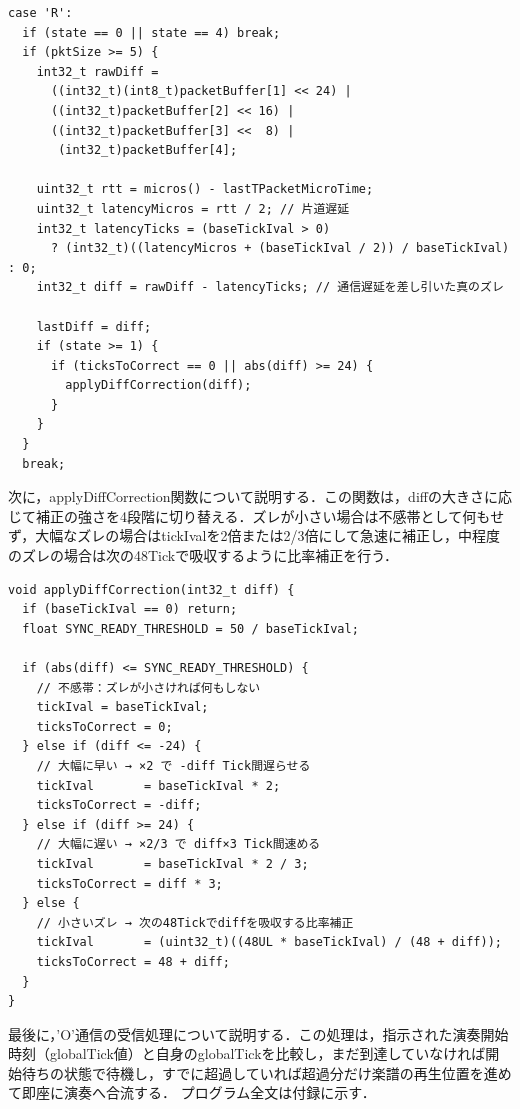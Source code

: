 \begin{lstlisting}[caption={flute\_0706.inoのloop関数（'R'通信受信部分・要部）}, label={lst:douki_slave_r}]
case 'R':
  if (state == 0 || state == 4) break;
  if (pktSize >= 5) {
    int32_t rawDiff =
      ((int32_t)(int8_t)packetBuffer[1] << 24) |
      ((int32_t)packetBuffer[2] << 16) |
      ((int32_t)packetBuffer[3] <<  8) |
       (int32_t)packetBuffer[4];

    uint32_t rtt = micros() - lastTPacketMicroTime;
    uint32_t latencyMicros = rtt / 2; // 片道遅延
    int32_t latencyTicks = (baseTickIval > 0)
      ? (int32_t)((latencyMicros + (baseTickIval / 2)) / baseTickIval) : 0;
    int32_t diff = rawDiff - latencyTicks; // 通信遅延を差し引いた真のズレ

    lastDiff = diff;
    if (state >= 1) {
      if (ticksToCorrect == 0 || abs(diff) >= 24) {
        applyDiffCorrection(diff);
      }
    }
  }
  break;
\end{lstlisting}

次に，applyDiffCorrection関数について説明する．この関数は，diffの大きさに応じて補正の強さを4段階に切り替える．ズレが小さい場合は不感帯として何もせず，大幅なズレの場合はtickIvalを2倍または2/3倍にして急速に補正し，中程度のズレの場合は次の48Tickで吸収するように比率補正を行う．

\begin{lstlisting}[caption={applyDiffCorrection関数}, label={lst:douki_diffcorrection}]
void applyDiffCorrection(int32_t diff) {
  if (baseTickIval == 0) return;
  float SYNC_READY_THRESHOLD = 50 / baseTickIval;

  if (abs(diff) <= SYNC_READY_THRESHOLD) {
    // 不感帯：ズレが小さければ何もしない
    tickIval = baseTickIval;
    ticksToCorrect = 0;
  } else if (diff <= -24) {
    // 大幅に早い → ×2 で -diff Tick間遅らせる
    tickIval       = baseTickIval * 2;
    ticksToCorrect = -diff;
  } else if (diff >= 24) {
    // 大幅に遅い → ×2/3 で diff×3 Tick間速める
    tickIval       = baseTickIval * 2 / 3;
    ticksToCorrect = diff * 3;
  } else {
    // 小さいズレ → 次の48Tickでdiffを吸収する比率補正
    tickIval       = (uint32_t)((48UL * baseTickIval) / (48 + diff));
    ticksToCorrect = 48 + diff;
  }
}
\end{lstlisting}

\fi

\noindent
最後に，'O'通信の受信処理について説明する．この処理は，指示された演奏開始時刻（globalTick値）と自身のglobalTickを比較し，まだ到達していなければ開始待ちの状態で待機し，すでに超過していれば超過分だけ楽譜の再生位置を進めて即座に演奏へ合流する．
プログラム全文は付録に示す．